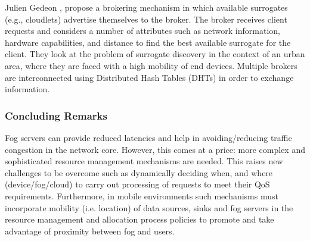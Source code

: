 \noindent\tab Julien Gedeon \cite{gedeon2017router}, propose a brokering mechanism in which available surrogates (e.g., cloudlets) advertise themselves to the broker. The broker receives client requests and considers a number of attributes such as network information, hardware capabilities, and distance to find the best available surrogate for the client. They look at the problem of surrogate discovery in the context of an urban area, where they are faced with a high mobility of end devices. Multiple brokers are interconnected using Distributed Hash Tables (DHTs) in order to exchange information.\\

\subsubsection{Concluding Remarks}
\noindent\tab Fog servers can provide reduced latencies and help in avoiding/reducing traffic congestion in the network core. However, this comes at a price: more complex and sophisticated resource management mechanisms are needed. This raises new challenges to be overcome such as dynamically deciding when, and where (device/fog/cloud) to carry out processing of requests to meet their QoS requirements. Furthermore, in mobile environments such mechanisms must incorporate mobility (i.e. location) of data sources, sinks and fog servers in the resource management and allocation process policies to promote and take advantage of proximity between fog and users.